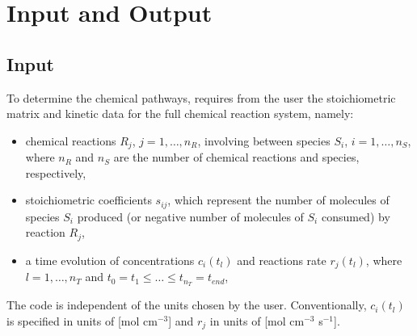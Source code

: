 
\chapter{Input and Output}
\label{chap_3}


\section{Input}
\label{sec_3_1}

To determine the chemical pathways, \pump{} requires from the user the stoichiometric 
matrix and kinetic data for the full chemical reaction system, namely:
\begin{itemize}
\item {chemical reactions $R_j$, $j = 1, \ldots, n_R$, involving between 
species $S_i$, $i = 1,\ldots, n_S$,
where $n_R$ and $n_S$ are the number of chemical reactions and species, respectively,
}
\item {stoichiometric coefficients $s_{ij}$, which represent the number of 
molecules of species $S_i$ produced (or negative number of molecules of 
$S_i$ consumed) by reaction $R_j$,}
\item{a time evolution of concentrations $c_i(t_l)$ and reactions rate $r_j(t_l)$, 
where $l = 1, \ldots, n_T$ and $t_0 = t_1\leq\ldots \leq t_{n_T}=t_{end}$,}
\end{itemize}
The code is independent of the units chosen by the user.  Conventionally, $c_i(t_l)$ is specified in units of [mol cm$^{-3}$] and $r_j$ in units of [mol cm$^{-3}$ s$^{-1}$].

